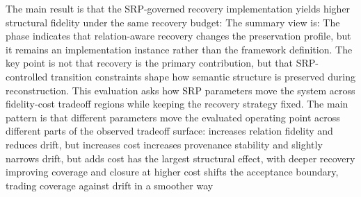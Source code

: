 {}
\markdownRendererSectionEnd \markdownRendererSectionBegin
{}\markdownRendererInterblockSeparator
{}The main result is that the SRP-governed recovery implementation yields higher structural fidelity under the same recovery budget:\markdownRendererInterblockSeparator
{}\markdownRendererInterblockSeparator
{}The summary view is:\markdownRendererInterblockSeparator
{}\markdownRendererInterblockSeparator
{}
\markdownRendererSectionEnd \markdownRendererSectionBegin
{}\markdownRendererInterblockSeparator
{}The phase indicates that relation-aware recovery changes the preservation profile, but it remains an implementation instance rather than the framework definition. The key point is not that recovery is the primary contribution, but that SRP-controlled transition constraints shape how semantic structure is preserved during reconstruction.\markdownRendererInterblockSeparator
{}
\markdownRendererSectionEnd 
\markdownRendererSectionEnd \markdownRendererSectionBegin
{}\markdownRendererInterblockSeparator
{}This evaluation asks how SRP parameters move the system across fidelity-cost tradeoff regions while keeping the recovery strategy fixed.\markdownRendererParagraphSeparator
{}The main pattern is that different parameters move the evaluated operating point across different parts of the observed tradeoff surface:\markdownRendererInterblockSeparator
{}\markdownRendererUlBeginTight
\markdownRendererUlItem {} increases relation fidelity and reduces drift, but increases cost\markdownRendererUlItemEnd 
\markdownRendererUlItem {} increases provenance stability and slightly narrows drift, but adds cost\markdownRendererUlItemEnd 
\markdownRendererUlItem {} has the largest structural effect, with deeper recovery improving coverage and closure at higher cost\markdownRendererUlItemEnd 
\markdownRendererUlItem {} shifts the acceptance boundary, trading coverage against drift in a smoother way\markdownRendererUlItemEnd 
